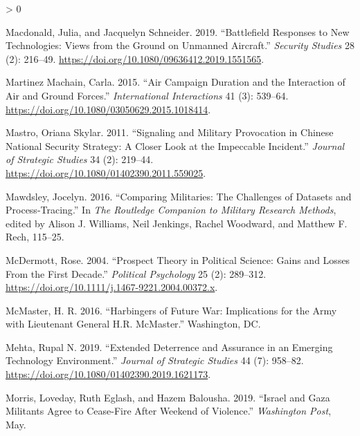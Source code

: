 \documentclass[
]{article}
\newlength{\cslhangindent}
\newenvironment{CSLReferences}[2] %
 {%
  \setlength{\parindent}{0pt}
  \ifodd #1 \everypar{\setlength{\hangindent}{\cslhangindent}}\ignorespaces\fi
  \ifnum #2 > 0
  \setlength{\parskip}{#2\baselineskip}
  \fi
 }%
 {}
\begin{document}
\begin{CSLReferences}{1}{0}
\leavevmode\hypertarget{ref-macdonald_battlefieldresponsesnew_2019}{}%
Macdonald, Julia, and Jacquelyn Schneider. 2019. {``Battlefield {Responses} to {New Technologies}: {Views} from the {Ground} on {Unmanned Aircraft}.''} \emph{Security Studies} 28 (2): 216--49. \url{https://doi.org/10.1080/09636412.2019.1551565}.

\leavevmode\hypertarget{ref-martinezmachain_aircampaignduration_2015}{}%
Martinez Machain, Carla. 2015. {``Air {Campaign Duration} and the {Interaction} of {Air} and {Ground Forces}.''} \emph{International Interactions} 41 (3): 539--64. \url{https://doi.org/10.1080/03050629.2015.1018414}.

\leavevmode\hypertarget{ref-mastro_signalingmilitaryprovocation_2011}{}%
Mastro, Oriana Skylar. 2011. {``Signaling and {Military Provocation} in {Chinese National Security Strategy}: {A Closer Look} at the {Impeccable Incident}.''} \emph{Journal of Strategic Studies} 34 (2): 219--44. \url{https://doi.org/10.1080/01402390.2011.559025}.

\leavevmode\hypertarget{ref-mawdsley_comparingmilitarieschallenges_2016}{}%
Mawdsley, Jocelyn. 2016. {``Comparing {Militaries}: {The Challenges} of {Datasets} and {Process-Tracing}.''} In \emph{The {Routledge Companion} to {Military Research Methods}}, edited by Alison J. Williams, Neil Jenkings, Rachel Woodward, and Matthew F. Rech, 115--25.

\leavevmode\hypertarget{ref-mcdermott_prospecttheorypolitical_2004}{}%
McDermott, Rose. 2004. {``Prospect {Theory} in {Political Science}: {Gains} and {Losses From} the {First Decade}.''} \emph{Political Psychology} 25 (2): 289--312. \url{https://doi.org/10.1111/j.1467-9221.2004.00372.x}.

\leavevmode\hypertarget{ref-mcmaster_harbingersfuturewar_2016}{}%
McMaster, H. R. 2016. {``Harbingers of {Future War}: {Implications} for the {Army} with {Lieutenant General H}.{R}. {McMaster}.''} {Washington, DC}.

\leavevmode\hypertarget{ref-mehta_extendeddeterrenceassurance_2019}{}%
Mehta, Rupal N. 2019. {``Extended Deterrence and Assurance in an Emerging Technology Environment.''} \emph{Journal of Strategic Studies} 44 (7): 958--82. \url{https://doi.org/10.1080/01402390.2019.1621173}.

\leavevmode\hypertarget{ref-morris_israelgazamilitants_2019}{}%
Morris, Loveday, Ruth Eglash, and Hazem Balousha. 2019. {``Israel and {Gaza} Militants Agree to Cease-Fire After Weekend of Violence.''} \emph{Washington Post}, May.


\end{CSLReferences}
\end{document}
